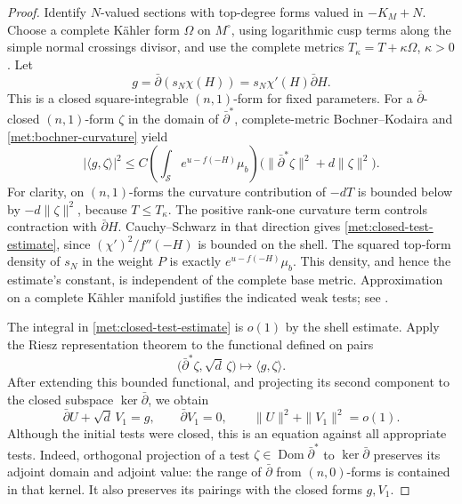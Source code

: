 \begin{proof}
Identify \(N\)-valued sections with top-degree forms valued in
\(-K_M+N\).  Choose a complete K\"ahler form \(\Omega\) on
\(M^\circ\), using logarithmic cusp terms along the simple normal
crossings divisor, and use the complete metrics
\(T_\kappa=T+\kappa\Omega\), \(\kappa>0\).  Let
\[
 g=\bar\partial(s_N\chi(H))
   =s_N\chi'(H)\bar\partial H.
\]
This is a closed square-integrable \((n,1)\)-form for fixed parameters.
For a \(\bar\partial\)-closed \((n,1)\)-form \(\zeta\) in the domain
of \(\bar\partial^*\), complete-metric Bochner--Kodaira and
\eqref{met:bochner-curvature} yield
\begin{equation}
 \label{met:closed-test-estimate}
 |\langle g,\zeta\rangle|^2
 \leq C\left(\int_{\mathcal S}e^{u-f(-H)}\mu_b\right)
       \bigl(\|\bar\partial^*\zeta\|^2+d\|\zeta\|^2\bigr).
\end{equation}
For clarity, on \((n,1)\)-forms the curvature contribution of
\(-dT\) is bounded below by \(-d\|\zeta\|^2\), because
\(T\leq T_\kappa\).  The positive rank-one curvature term controls
contraction with \(\bar\partial H\).  Cauchy--Schwarz in that
direction gives \eqref{met:closed-test-estimate}, since
\((\chi')^2/f''(-H)\) is bounded on the shell.  The squared top-form
density of \(s_N\) in the weight \(P\) is exactly
\(e^{u-f(-H)}\mu_b\).  This density, and hence the estimate's
constant, is independent of the complete base metric.  Approximation
on a complete K\"ahler manifold justifies the indicated weak tests;
see \cite[Sections 4--5]{DemaillyL2}.

The integral in \eqref{met:closed-test-estimate} is \(o(1)\) by the
shell estimate.  Apply the Riesz representation theorem to the
functional defined on pairs
\[
 \bigl(\bar\partial^*\zeta,\sqrt d\,\zeta\bigr)
 \longmapsto\langle g,\zeta\rangle.
\]
After extending this bounded functional, and projecting its second
component to the closed subspace \(\ker\bar\partial\), we obtain
\begin{equation}
 \label{met:residual-riesz}
 \bar\partial U+\sqrt d\,V_1=g,
 \qquad \bar\partial V_1=0,
 \qquad \|U\|^2+\|V_1\|^2=o(1).
\end{equation}
Although the initial tests were closed, this is an equation against
all appropriate tests.  Indeed, orthogonal projection of a test
\(\zeta\in\operatorname{Dom}\bar\partial^*\) to
\(\ker\bar\partial\) preserves its adjoint domain and adjoint value:
the range of \(\bar\partial\) from \((n,0)\)-forms is contained in
that kernel.  It also preserves its pairings with the closed forms
\(g,V_1\).


\end{proof}
